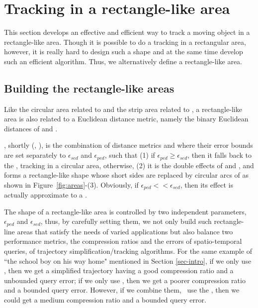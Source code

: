 

\section{Tracking in a rectangle-like area}
\label{sec:rectangle}

This section develops an effective and efficient way to track a moving object in a rectangle-like area. Though it is possible to do a tracking in a rectangular area, however, it is really hard to design such a shape and at the same time develop such an efficient algorithm. Thus, we alternatively define a rectangle-like area.


\subsection{Building the rectangle-like areas}

Like the circular area related to \sed and the strip area related to \ped, a rectangle-like area is also related to a Euclidean distance metric, namely the binary Euclidean distances of \sed and \ped.

, shortly \bed (\sed, \ped), is the combination of distance metrics \sed and \ped where their error bounds are set separately to $\epsilon_{sed}$ and $\epsilon_{ped}$, such that (1) if $\epsilon_{ped} \ge \epsilon_{sed}$, then it falls back to the \sed, \ie tracking in a circular area, otherwise, (2) it is the double effects of \ped and \sed, and forms a rectangle-like shape whose short sides are replaced by circular arcs of \sed as shown in {Figure~\ref{fig:areas}-(3)}. Obviously, if $\epsilon_{ped} << \epsilon_{sed}$, then its effect is actually approximate to a \ped.

The shape of a rectangle-like area is controlled by two independent parameters, $\epsilon_{ped}$ and $\epsilon_{sed}$, thus, by carefully setting them, we not only build such rectangle-line areas that satisfy the needs of varied applications but also balance two performance metrics, the compression ratios and the errors of spatio-temporal queries, of trajectory simplification/tracking algorithms. 
For the same example of ``the school boy on his way home" mentioned in Section \ref{sec-intro}, if we only use \ped, then we get a simplified trajectory having a good compression ratio and a unbounded query error; if we only use \sed, then we get a poorer compression ratio and a bounded query error. However, if we combine them, \ie~use the \bed, then we could get a medium compression ratio and a bounded query error.



